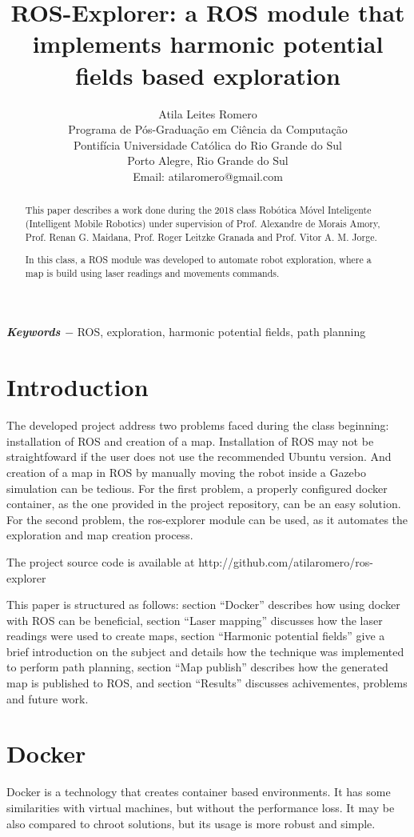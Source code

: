 \documentclass[a4paper,twocolumn]{article}
\title{ROS-Explorer: a ROS module that implements harmonic potential fields based exploration}
\author{
    Atila Leites Romero \\
    Programa de Pós-Graduação em Ciência da Computação \\
    Pontifícia Universidade Católica do Rio Grande do Sul \\
    Porto Alegre, Rio Grande do Sul \\
    Email: atilaromero@gmail.com
    }
\begin{document}
\date{}
\maketitle

\begin{abstract}
    This paper describes a work done during the 2018 class Robótica Móvel Inteligente (Intelligent Mobile Robotics) under supervision of Prof. Alexandre de Morais Amory, Prof. Renan G. Maidana, Prof. Roger Leitzke Granada and Prof. Vitor A. M. Jorge.
    
    In this class, a ROS module was developed to automate robot exploration, where a map is build using laser readings and movements commands.
\end{abstract}
{
    \par	
    \textbf{\textit{Keywords $-$}} 
    ROS, exploration, harmonic potential fields, path planning
}

\section{Introduction}
    The developed project address two problems faced during the class beginning: installation of ROS and creation of a map. Installation of ROS may not be straightfoward if the user does not use the recommended Ubuntu version. And creation of a map in ROS by manually moving the robot inside a Gazebo simulation can be tedious. For the first problem, a properly configured docker container, as the one provided in the project repository, can be an easy solution. For the second problem, the ros-explorer module can be used, as it automates the exploration and map creation process.

    The project source code is available at http://github.com/atilaromero/ros-explorer

    This paper is structured as follows: section ``Docker'' describes how using docker with ROS can be beneficial, section ``Laser mapping'' discusses how the laser readings were used to create maps, section ``Harmonic potential fields'' give a brief introduction on the subject and details how the technique was implemented to perform path planning, section ``Map publish'' describes how the generated map is published to ROS, and section ``Results'' discusses achivementes, problems and future work.

\section{Docker}
    Docker is a technology that creates container based environments. It has some similarities with virtual machines, but without the performance loss. It may be also compared to chroot solutions, but its usage is more robust and simple.
\end{document}
